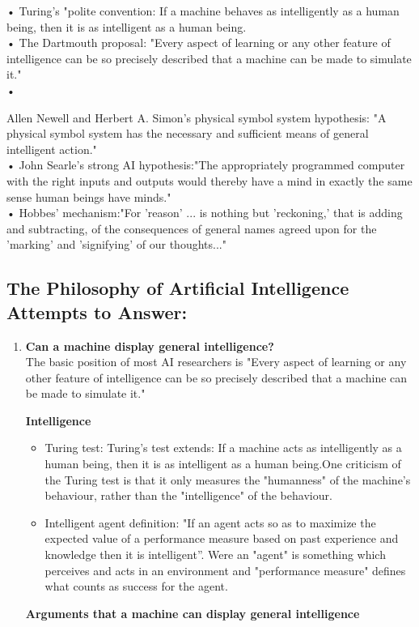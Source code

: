 \documentclass{article}
\begin{document}
• Turing's "polite convention: If a machine behaves as intelligently as a human being, then it is as intelligent as a human being. \\
• The Dartmouth proposal: "Every aspect of learning or any other feature of intelligence can be so precisely described that a machine can be made to simulate it."\\
• {Allen Newell and Herbert A. Simon's physical symbol system hypothesis:  "A physical symbol system has the necessary and sufficient means of general intelligent action."\\
• John Searle's strong AI hypothesis:"The appropriately programmed computer with the right inputs and outputs would thereby have a mind in exactly the same sense human beings have minds."\\
• Hobbes' mechanism:"For 'reason' ... is nothing but 'reckoning,' that is adding and subtracting, of the consequences of general names agreed upon for the 'marking' and 'signifying' of our thoughts..."
\subsection*{The Philosophy of Artificial Intelligence Attempts to Answer:}
\begin{enumerate} 
 \item\textbf{Can a machine display general intelligence?} \\
The basic position of most AI researchers is "Every aspect of learning or any other feature of intelligence can be so precisely described that a machine can be made to simulate it."

\textbf{Intelligence} 
	\begin{itemize}
	\item 	Turing test: Turing's test extends: If a machine acts as intelligently as a human being, then it is as intelligent as a human being.One criticism of the Turing test is that it only measures the "humanness" of the machine's behaviour, rather than the "intelligence" of the behaviour.
	\item Intelligent agent definition:
"If an agent acts so as to maximize the expected value of a performance measure based on past experience and knowledge then it is intelligent”. Were an "agent" is something which perceives and acts in an environment and "performance measure" defines what counts as success for the agent.
	\end{itemize}
\textbf{Arguments that a machine can display general intelligence}
	

\end{enumerate}}
\end{document}
